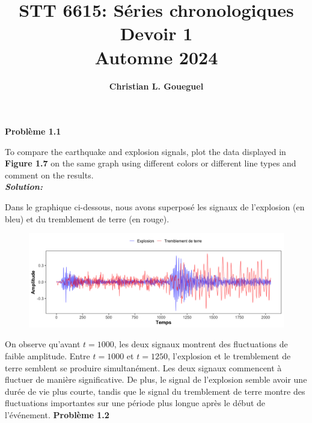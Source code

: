 \documentclass{homework}
\title{\textbf{STT 6615: Séries chronologiques}\\Devoir 1\\Automne 2024}
\author{\textbf{Christian L. Goueguel}}
\begin{document}
\begin{titlingpage}
\maketitle
\end{titlingpage}
\textbf{\Large{Problème 1.1}}

To compare the earthquake and explosion signals, plot the data displayed in \textbf{Figure 1.7} on the same graph using different colors or different line types and comment on the results. \\

\textit{\textbf{Solution:}}

Dans le graphique ci-dessous, nous avons superposé les signaux de l'explosion (en bleu) et du tremblement de terre (en rouge).

\begin{figure}[h]
    \centering
    \includegraphics[width=1\linewidth]{figure1.1.png}
\end{figure}

On observe qu'avant $t=1000$, les deux signaux montrent des fluctuations de faible amplitude. Entre $t=1000$ et $t=1250$, l'explosion et le tremblement de terre semblent se produire simultanément. Les deux signaux commencent à fluctuer de manière significative. De plus, le signal de l'explosion semble avoir une durée de vie plus courte, tandis que le signal du tremblement de terre montre des fluctuations importantes sur une période plus longue après le début de l'événement.
\newpage
\textbf{\Large{Problème 1.2}}
\end{document}
